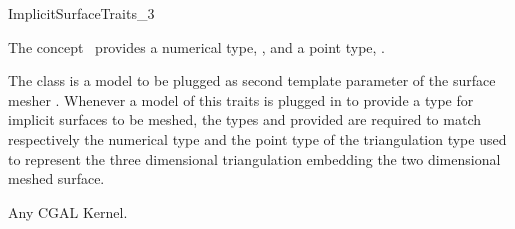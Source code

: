 

\begin{ccRefConcept}{ImplicitSurfaceTraits_3}


\ccDefinition
  
The concept \ccRefName\ provides a numerical type, ,
and a point type, .

The class 
is a model to be plugged 
as  second template parameter of the surface mesher
. 
Whenever a model of this traits is plugged
in  
to provide a type for  implicit surfaces to be
meshed, 
the types  and 
provided are required to match respectively  the numerical type
and the point type of the triangulation type 
used to represent the three dimensional triangulation embedding
the two dimensional meshed surface.



\ccTypes

\ccGlue
{}





\ccHasModels

Any CGAL Kernel.


\ccSeeAlso


\end{ccRefConcept}
